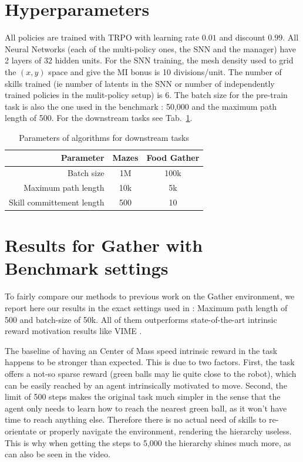 \documentclass{article} %
\begin{document}



\appendix
\section{Hyperparameters}
\label{sec:hyper}
All policies are trained with TRPO with learning rate $0.01$ and discount $0.99$. All Neural Networks (each of the multi-policy ones, the SNN and the manager) have 2 layers of 32 hidden units. For the SNN training, the mesh density used to grid the $(x, y)$ space and give the MI bonus is 10 divisions/unit. The number of skills trained (ie number of latents in the SNN or number of independently trained policies in the mulit-policy setup) is 6. The batch size for the pre-train task is also the one used in the benchmark \citep{duan2016benchmarking}: 50,000 and the maximum path length of 500. For the downstream tasks see Tab.\ \ref{tab:params}.

\begin{table}[h!]
\centering
\begin{tabular}[t]{r|c|c}
Parameter & Mazes & Food Gather \\
\hline
Batch size & 1M & 100k \\
Maximum path length & 10k & 5k \\
Skill committement length & 500 & 10
\end{tabular}
\caption{Parameters of algorithms for downstream tasks}
\label{tab:params}
\end{table}

\section{Results for Gather with Benchmark settings}
To fairly compare our methods to previous work on the Gather environment, we report here our results in the exact settings used in \citet{duan2016benchmarking}: Maximum path length of 500 and batch-size of 50k. All of them outperforms state-of-the-art intrinsic reward motivation results like VIME \citep{houthooft2016variational}.

The baseline of having an Center of Mass speed intrinsic reward in the task happens to be stronger than expected. This is due to two factors. First, the task offers a not-so sparse reward (green balls may lie quite close to the robot), which can be easily reached by an agent intrinsically motivated to move. Second, the limit of 500 steps makes the original task much simpler in the sense that the agent only needs to learn how to reach the nearest green ball, as it won't have time to reach anything else. Therefore there is no actual need of skills to re-orientate or properly navigate the environment, rendering the hierarchy useless. This is why when getting the steps to 5,000 the hierarchy shines much more, as can also be seen in the video.
\end{document}
